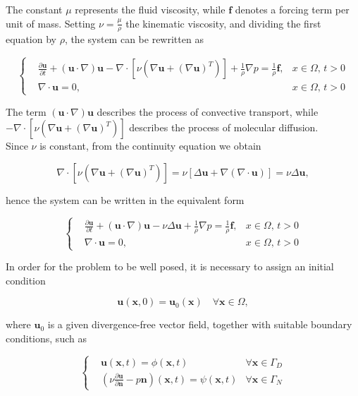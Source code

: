 \documentclass[11pt,a4paper,titlepage]{report}
\begin{document}
The constant $\mu$ represents the fluid viscosity, while $\mathbf{f}$ denotes a forcing term per unit of mass. Setting $\nu = \frac{\mu}{\rho}$ the kinematic viscosity, and dividing the first equation by $\rho$, the system can be rewritten as

\[
\left\{  
\begin{aligned}
&\frac{\partial \mathbf{u}}{\partial t} + ( \mathbf{u} \cdot \nabla) \mathbf{u} - \nabla \cdot [ \nu (\nabla \mathbf{u} + (\nabla  \mathbf{u})^T)] + \frac{1}{\rho} \nabla p = \frac{1}{\rho} \mathbf{f},  & x \in \Omega, \, t>0 \\
& \nabla \cdot \mathbf{u} = 0, & x \in \Omega, \, t>0
\end{aligned}
\right.
\]

The term $(\mathbf{u} \cdot \nabla)\mathbf{u}$ describes the process of convective transport, while $- \nabla \cdot [ \nu (\nabla \mathbf{u} + (\nabla  \mathbf{u})^T)] $ describes the process of molecular diffusion.\\
Since $\nu$ is constant, from the continuity equation we obtain

\[
\nabla \cdot [ \nu (\nabla \mathbf{u} + (\nabla  \mathbf{u})^T)] = \nu [\Delta \mathbf{u} + \nabla(\nabla \cdot \mathbf{u})] = \nu \Delta \mathbf{u},
\]

hence the system can be written in the equivalent form

\[
\left\{  
\begin{aligned}
&\frac{\partial \mathbf{u}}{\partial t} + ( \mathbf{u} \cdot \nabla) \mathbf{u} - \nu \Delta \mathbf{u} + \frac{1}{\rho} \nabla p = \frac{1}{\rho} \mathbf{f},  & x \in \Omega, \, t>0 \\
& \nabla \cdot \mathbf{u} = 0, & x \in \Omega, \, t>0
\end{aligned}
\right.
\]

In order for the problem to be well posed, it is necessary to assign an initial condition 

\[
\mathbf{u} (\mathbf{x}, 0) = \mathbf{u}_0(\mathbf{x}) \quad \forall \mathbf{x} \in \Omega,
\]

where $\mathbf{u}_0$ is a given divergence-free vector field, together with suitable boundary conditions, such as

\[
\left\{  
\begin{aligned}
& \mathbf{u}(\mathbf{x},t) = \phi (\mathbf{x}, t) & \forall \mathbf{x} \in \Gamma_D \\
& \left( \nu \frac{\partial \mathbf{u}}{\partial \mathbf{n}} - p\mathbf{n} \right) (\mathbf{x},t) = \psi(\mathbf{x},t) & \forall \mathbf{x} \in \Gamma_N
\end{aligned}
\right.
\]
\end{document}
